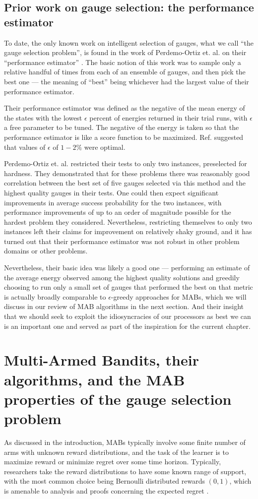 \subsection{Prior work on gauge selection: the performance estimator}
To date, the only known work on intelligent selection of gauges, what we call ``the gauge selection problem'', is found in the work of Perdemo-Ortiz et. al. on their ``performance estimator'' \cite{perdomo:15a}. The basic notion of this work was to sample only a relative handful of times from each of an ensemble of gauges, and then pick the best one --- the meaning of ``best'' being whichever had the largest value of their performance estimator.

Their performance estimator was defined as the negative of the mean energy of the states with the lowest $\epsilon$ percent of energies returned in their trial runs, with $\epsilon$ a free parameter to be tuned. The negative of the energy is taken so that the performance estimator is like a score function to be maximized. Ref. \cite{perdomo:15a} suggested that values of $\epsilon$ of $1-2\%$ were optimal.

Perdemo-Ortiz et. al. restricted their tests to only two instances, preselected for hardness. They demonstrated that for these problems there was reasonably good correlation between the best set of five gauges selected via this method and the highest quality gauges in their tests. One could then expect significant improvements in average success probability for the two instances, with performance improvements of up to an order of magnitude possible for the hardest problem they considered. Nevertheless, restricting themselves to only two instances left their claims for improvement on relatively shaky ground, and it has turned out that their performance estimator was not robust in other problem domains or other problems.

Nevertheless, their basic idea was likely a good one --- performing an estimate of the average energy observed among the highest quality solutions and greedily choosing to run only a small set of gauges that performed the best on that metric is actually broadly comparable to $\epsilon$-greedy approaches for MABs, which we will discuss in our review of MAB algorithms in the next section. And their insight that we should seek to exploit the idiosyncracies of our processors as best we can is an important one and served as part of the inspiration for the current chapter.

\section{Multi-Armed Bandits, their algorithms, and the MAB properties of the gauge selection problem}
As discussed in the introduction, MABs typically involve some finite number of arms with unknown reward distributions, and the task of the learner is to maximize reward or minimize regret over some time horizon. Typically, researchers take the reward distributions to have some known range of support, with the most common choice being Bernoulli distributed rewards $(0,1)$, which is amenable to analysis and proofs concerning the expected regret \cite{banditalgorithms,bayesian_bandit}.

